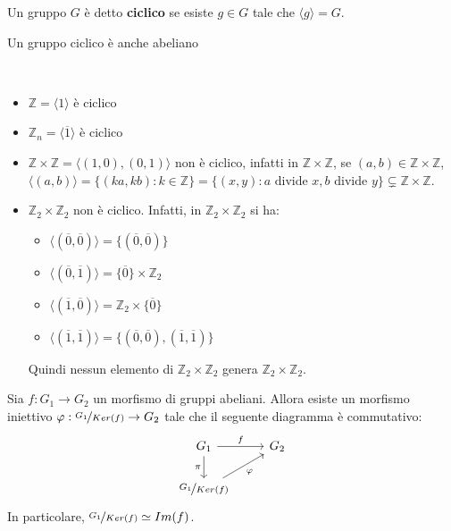 \documentclass[../main.tex]{subfiles}
\begin{document}
\begin{definition}
    Un gruppo $G$ è detto \textbf{ciclico} se esiste $g \in G$ tale che $\langle g \rangle = G$.

    Un gruppo ciclico è anche abeliano
\end{definition}

\begin{example}
    \
    \begin{itemize}
        \item $\mathbb{Z} = \langle 1 \rangle$ è ciclico
        \item $\mathbb{Z}_n = \langle \overline{1} \rangle$ è ciclico
        \item $\mathbb{Z} \times \mathbb{Z} = \langle (1,0), (0,1) \rangle$ non è ciclico,
              infatti in $\mathbb{Z}  \times \mathbb{Z} $, se $(a,b) \in \mathbb{Z} \times \mathbb{Z} $,
              $\langle (a,b) \rangle = \{(ka,kb) : k \in \mathbb{Z} \} = \{(x,y) : a \text{ divide } x,b \text{ divide } y\}
                  \subsetneq \mathbb{Z} \times \mathbb{Z} $.
        \item $\mathbb{Z}_2 \times \mathbb{Z}_2$ non è ciclico. Infatti, in $\mathbb{Z}_2 \times \mathbb{Z}_2$ si ha:
              \
              \begin{itemize}
                  \item $\langle (\overline{0},\overline{0}) \rangle = \{(\overline{0},\overline{0})\}$
                  \item $\langle (\overline{0}, \overline{1}) \rangle = \{\overline{0}\} \times \mathbb{Z}_2$
                  \item  $\langle (\overline{1}, \overline{0}) \rangle = \mathbb{Z}_2 \times \{\overline{0}\}$
                  \item $\langle (\overline{1}, \overline{1}) \rangle = \{(\overline{0},\overline{0}),(\overline{1},\overline{1})\}$
              \end{itemize}
              Quindi nessun elemento di $\mathbb{Z}_2 \times \mathbb{Z}_2$ genera $\mathbb{Z}_2 \times \mathbb{Z}_2$.
    \end{itemize}
\end{example}

\begin{theorem}
    Sia $f: G_1 \rightarrow G_2$ un morfismo di gruppi abeliani. Allora esiste un morfismo iniettivo $\varphi : \nicefrac{G_1}{Ker(f)} \rightarrow G_2$ tale che il seguente diagramma è commutativo:
    \begin{equation*}
        \begin{tikzcd}
            G_1 \arrow[r, "f"] \arrow[d, "\pi"'] & G_2 \\
            \nicefrac{G_1}{Ker(f)} \arrow[ru, "\varphi"']
        \end{tikzcd}
    \end{equation*}
    In particolare, $\nicefrac{G_1}{Ker(f)} \simeq Im(f)$.
\end{theorem}
\end{document}
